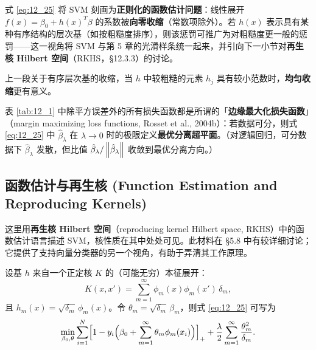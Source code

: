 \begin{remark}[正则化函数估计的视角]
式 \ref{eq:12_25} 将 SVM 刻画为\textbf{正则化的函数估计问题}：线性展开 $f(x)=\beta_0 + h(x)^T\beta$ 的系数被\textbf{向零收缩}（常数项除外）。若 $h(x)$ 表示具有某种有序结构的层次基（如按粗糙度排序），则该惩罚可推广为对粗糙度更一般的惩罚——这一视角将 SVM 与第 5 章的光滑样条统一起来，并引向下一小节对\textbf{再生核 Hilbert 空间}（RKHS，§12.3.3）的讨论。
\end{remark}

\begin{remark}[均匀收缩与边缘最大化损失]
上一段关于有序层次基的收缩，当 $h$ 中较粗糙的元素 $h_j$ 具有较小范数时，\textbf{均匀收缩}更有意义。

表 \ref{tab:12_1} 中除平方误差外的所有损失函数都是所谓的「\textbf{边缘最大化损失函数}」（margin maximizing loss functions, Rosset et al., 2004b）：若数据可分，则式 \ref{eq:12_25} 中 $\hat\beta_\lambda$ 在 $\lambda\to 0$ 时的极限定义\textbf{最优分离超平面}。（对逻辑回归，可分数据下 $\hat\beta_\lambda$ 发散，但比值 $\hat\beta_\lambda/\left\lVert\hat\beta_\lambda\right\rVert$ 收敛到最优分离方向。）
\end{remark}

\subsection{函数估计与再生核 (Function Estimation and Reproducing Kernels)}

这里用\textbf{再生核 Hilbert 空间}（reproducing kernel Hilbert space, RKHS）中的函数估计语言描述 SVM，核性质在其中处处可见。此材料在 §5.8 中有较详细讨论；它提供了支持向量分类器的另一个视角，有助于弄清其工作原理。

\begin{definition}[核的本征展开]
设基 $h$ 来自一个正定核 $K$ 的（可能无穷）本征展开：
\begin{equation}
K(x,x') = \sum_{m=1}^{\infty}\phi_m(x)\phi_m(x')\,\delta_m, \label{eq:12_26}
\end{equation}
且 $h_m(x) = \sqrt{\delta_m}\,\phi_m(x)$。令 $\theta_m = \sqrt{\delta_m}\,\beta_m$，则式 \ref{eq:12_25} 可写为
\begin{equation}
\min_{\beta_0,\theta} \sum_{i=1}^{N}\Bigl[1 - y_i\Bigl(\beta_0 + \sum_{m=1}^{\infty}\theta_m \phi_m(x_i)\Bigr)\Bigr]_+ + \frac{\lambda}{2}\sum_{m=1}^{\infty}\frac{\theta_m^2}{\delta_m}. \label{eq:12_27}
\end{equation}
\end{definition}

